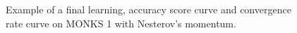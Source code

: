 \begin{appendices}
\begin{figure}[H]
\begin{subfigure}{0.40\textwidth}
                    \label{fig:monks_1_ACC_SGD}
                \end{subfigure}
                \begin{subfigure}{0.40\textwidth}
                    \caption{}
                    \label{fig:monks_1_NORM_SGD}
                \end{subfigure}
                \caption{Example of a final learning, accuracy score curve and
                convergence rate curve on MONKS 1 with Nesterov's momentum.}
                \label{fig:monks_1_SGD}
            \end{figure}


\end{appendices}

